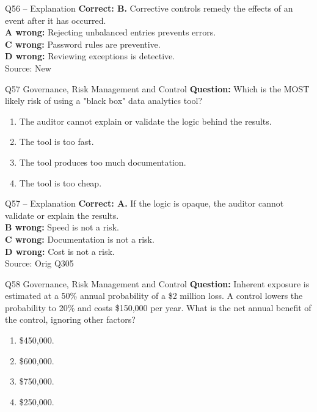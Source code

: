 \documentclass[aspectratio=169,10pt]{beamer}
\begin{document}
\begin{frame}[t]{Q56 -- Explanation}
	\footnotesize
	\textbf{Correct: B.} Corrective controls remedy the effects of an event after it has occurred. \\[5pt]
\textbf{A wrong:} Rejecting unbalanced entries prevents errors. \\[3pt]
\textbf{C wrong:} Password rules are preventive. \\[3pt]
\textbf{D wrong:} Reviewing exceptions is detective. \\[3pt]
	\vfill {\tiny Source: New}
\end{frame}

\begin{frame}[t]{Q57 \hfill {\scriptsize Governance, Risk Management and Control}}
	\small
	\textbf{Question:} Which is the MOST likely risk of using a "black box" data analytics tool?
	\begin{enumerate}[label=\Alph*.,itemsep=1pt,topsep=3pt]
			\item The auditor cannot explain or validate the logic behind the results.
			\item The tool is too fast.
			\item The tool produces too much documentation.
			\item The tool is too cheap.
	\end{enumerate}
\end{frame}

\begin{frame}[t]{Q57 -- Explanation}
	\footnotesize
	\textbf{Correct: A.} If the logic is opaque, the auditor cannot validate or explain the results. \\[5pt]
\textbf{B wrong:} Speed is not a risk. \\[3pt]
\textbf{C wrong:} Documentation is not a risk. \\[3pt]
\textbf{D wrong:} Cost is not a risk. \\[3pt]
	\vfill {\tiny Source: Orig Q305}
\end{frame}

\begin{frame}[t]{Q58 \hfill {\scriptsize Governance, Risk Management and Control}}
	\small
	\textbf{Question:} Inherent exposure is estimated at a 50\% annual probability of a \$2 million loss. A control lowers the probability to 20\% and costs \$150,000 per year. What is the net annual benefit of the control, ignoring other factors?
	\begin{enumerate}[label=\Alph*.,itemsep=1pt,topsep=3pt]
			\item \$450,000.
			\item \$600,000.
			\item \$750,000.
			\item \$250,000.
	\end{enumerate}
\end{frame}
\end{document}
